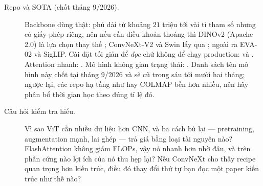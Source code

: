 \documentclass[../../deep_learning.tex]{subfiles}
\begin{document}
\begin{description}
\item[Repo và SOTA (chốt tháng 9/2026).] Backbone dùng thật:  phủ dải từ khoảng \(21\) triệu tới vài tỉ tham số nhưng có giấy phép riêng, nên nếu cần điều khoản thoáng thì DINOv2 (Apache 2.0) là lựa chọn thay thế \cite{oquab2024dinov2}; ConvNeXt-V2 và Swin lấy qua ; ngoài ra EVA-02 và SigLIP. Cài đặt tối giản để \emph{đọc} chứ không để chạy production:  và . Attention nhanh: . Mô hình không gian trạng thái: . Danh sách tên mô hình này chốt tại tháng 9/2026 và sẽ cũ trong sáu tới mười hai tháng; ngược lại, các repo hạ tầng như  hay COLMAP bền hơn nhiều, nên hãy phân bổ thời gian học theo đúng tỉ lệ đó.
\item[Câu hỏi kiểm tra hiểu.] Vì sao ViT cần nhiều dữ liệu hơn CNN, và ba cách bù lại --- pretraining, augmentation mạnh, lai ghép --- trả giá bằng loại tài nguyên nào? FlashAttention không giảm FLOPs, vậy nó nhanh hơn nhờ đâu, và trên phần cứng nào lợi ích của nó thu hẹp lại? Nếu ConvNeXt cho thấy recipe quan trọng hơn kiến trúc, điều đó thay đổi thứ tự bạn đọc một paper kiến trúc như thế nào?
\end{description}
\end{document}

